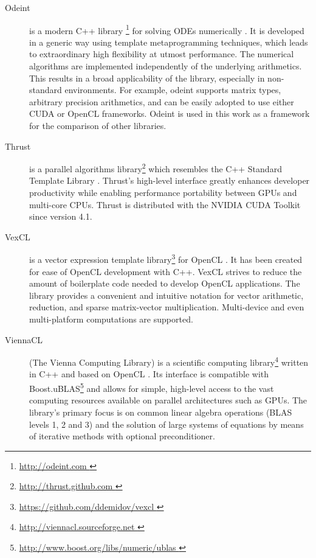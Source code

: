 \documentclass[final]{siamltex}
\begin{document}
\begin{description}
    \item[Odeint] is a modern C++ library \footnote{ \href{ http://odeint.com }{
        http://odeint.com } } for solving ODEs numerically \cite{OdeintRef1, OdeintRef2}.
        It is developed in a generic
        way using template metaprogramming techniques, which leads to extraordinary high
        flexibility at utmost performance. The numerical algorithms are
        implemented independently of the underlying arithmetics. This results
        in a broad applicability of the library, especially in non-standard
        environments.  For example, odeint supports matrix types, arbitrary
        precision arithmetics, and can be easily adopted to use either CUDA or
        OpenCL frameworks.  Odeint is used in this work as a framework for the
        comparison of other libraries.
    \item[Thrust] is a parallel algorithms library\footnote{ \href{
        http://thrust.github.com }{ http://thrust.github.com }} which resembles
        the C++ Standard Template Library \cite{ThrustRef}.  Thrust's
        high-level interface greatly enhances developer productivity while
        enabling performance portability between GPUs and multi-core CPUs.
        Thrust is distributed with the NVIDIA CUDA Toolkit since version 4.1.
    \item[VexCL] is a vector expression template
        library\footnote{ \href{ https://github.com/ddemidov/vexcl }{
        https://github.com/ddemidov/vexcl }} for OpenCL \cite{VexCLRef}. It has
        been created for ease of OpenCL development with C++.  VexCL strives to
        reduce the amount of boilerplate code needed to develop OpenCL
        applications. The library provides a convenient and intuitive notation
        for vector arithmetic, reduction, and sparse matrix-vector
        multiplication.  Multi-device and even multi-platform computations are
        supported.
    \item[ViennaCL] (The Vienna Computing Library) is a scientific computing
        library\footnote{ \href{ http://viennacl.sourceforge.net }{
        http://viennacl.sourceforge.net }} written in C++ and based on OpenCL
        \cite{ViennaCLRef}. Its interface is compatible with
        Boost.uBLAS\footnote{ \href{ http://www.boost.org/libs/numeric/ublas }
        { http://www.boost.org/libs/numeric/ublas } }
        and allows for simple, high-level access to the vast
        computing resources available on parallel architectures such as GPUs.
        The library's primary focus is on common linear algebra operations (BLAS
        levels 1, 2 and 3) and the solution of large systems of equations by
        means of iterative methods with optional preconditioner.
\end{description}
\end{document}
